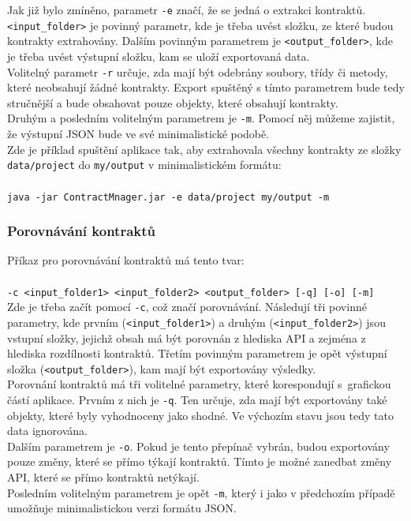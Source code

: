 			Jak již bylo zmíněno, parametr \texttt{-e} značí, že se jedná o extrakci kontraktů. \texttt{<input\_folder>} je povinný parametr, kde je třeba uvést složku, ze které budou kontrakty extrahovány. Dalším povinným parametrem je \texttt{<output\_folder>}, kde je třeba uvést výstupní složku, kam se uloží exportovaná data.\\
			
			Volitelný parametr \texttt{-r} určuje, zda mají být odebrány soubory, třídy či metody, které neobsahují žádné kontrakty. Export spuštěný s tímto parametrem bude tedy stručnější a bude obsahovat pouze objekty, které obsahují kontrakty.\\
			
			Druhým a posledním volitelným parametrem je \texttt{-m}. Pomocí něj můžeme zajistit, že výstupní JSON bude ve své minimalistické podobě.\\
			
			Zde je příklad spuštění aplikace tak, aby extrahovala všechny kontrakty ze složky \texttt{data/project} do \texttt{my/output} v minimalistickém formátu:\\\\
			\- \- \- \texttt{java -jar ContractMnager.jar -e data/project my/output -m}
			
		\subsubsection{Porovnávání kontraktů}
			Příkaz pro porovnávání kontraktů má tento tvar:\\\\
			\- \- \- \texttt{-c <input\_folder1> <input\_folder2> <output\_folder> [-q] [-o] [-m]}\\
			
			Zde je třeba začít pomocí \texttt{-c}, což značí porovnávání. Následují tři povinné parametry, kde prvním (\texttt{<input\_folder1>}) a druhým (\texttt{<input\_folder2>}) jsou vstupní složky, jejichž obsah má být porovnán z hlediska API a zejména z hlediska rozdílnosti kontraktů. Třetím povinným parametrem je opět výstupní složka (\texttt{<output\_folder>}), kam mají být exportovány výsledky.\\
			
			Porovnání kontraktů má tři volitelné parametry, které korespondují s~grafickou částí aplikace. Prvním z nich je \texttt{-q}. Ten určuje, zda mají být exportovány také objekty, které byly vyhodnoceny jako shodné. Ve výchozím stavu jsou tedy tato data ignorována.\\
			
			Dalším parametrem je \texttt{-o}. Pokud je tento přepínač vybrán, budou exportovány pouze změny, které se přímo týkají kontraktů. Tímto je možné zanedbat změny API, které se přímo kontraktů netýkají.\\
			
			Posledním volitelným parametrem je opět \texttt{-m}, který i jako v předchozím případě umožňuje minimalistickou verzi formátu JSON.
